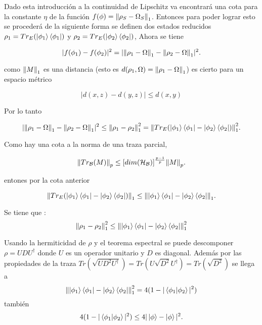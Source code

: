 Dado esta introducción a la continuidad de Lipschitz va encontrará una cota para la constante $\eta$ de la función $f(\phi)=\norm{\rho_{S}-\Omega_{S}}_{1}$. Entonces para poder lograr esto se procederá de la siguiente forma se definen dos estados reducidos $\rho_{1}= Tr_{E} (\ket{\phi_{1}} \bra{\phi_{1}})$ y $\rho_{2}=Tr_{E}(\ket{\phi_{2}} \bra{\phi_{2}})$, Ahora se tiene

\begin{equation}
|f(\phi_{1})-f(\phi_{2})|^2= |\norm{\rho_{1}-\Omega}_{1} - \norm{\rho_{2}-\Omega}_{1}|^2.
\end{equation}

como $\norm{M}_{1}$ es una distancia (esto es $d(\rho_{1},\Omega)= \norm{\rho_{1}-\Omega}_{1}$) es cierto para un espacio métrico

\begin{equation}
|d(x,z)-d(y,z)| \le d(x,y)
\end{equation}

Por lo tanto 

\begin{equation}
|\norm{\rho_{1}-\Omega}_{1} - \norm{\rho_{2}-\Omega}_{1}|^2 \le \norm{\rho_{1}- \rho_{2} }_{1}^2=\norm{Tr_{E}(\ket{\phi_{1}} \bra{\phi_{1}}-\ket{\phi_{2}} \bra{\phi_{2}})}_{1}^{2}.
\end{equation}

Como hay una cota a la norma de una traza parcial,

\begin{equation}
\norm{Tr_{\mathcal{B}}(M)}_{p} \le [dim(\mathcal{H_{B}})]^{\frac{p-1}{p}} \norm{M}_{p}.
\end{equation}

entones por la cota anterior

\begin{equation}
\norm{Tr_{E}(\ket{\phi_{1}} \bra{\phi_{1}}-\ket{\phi_{2}} \bra{\phi_{2}})}_{1} \le \norm{\ket{\phi_{1}} \bra{\phi_{1}}-\ket{\phi_{2}} \bra{\phi_{2}}}_{1}.
\end{equation}

Se tiene que :
\begin{equation}
\norm{\rho_{1}- \rho_{2} }_{1}^2 \le \norm{\ket{\phi_{1}} \bra{\phi_{1}}-\ket{\phi_{2}} \bra{\phi_{2}}}_{1}^{2}
\end{equation}

Usando la hermiticidad de $\rho$ y el teorema espectral se puede descomponer $\rho= UDU^{\dag}$ donde $U$ es un operador unitario y $D$ es diagonal. Además por las propiedades de la traza $Tr(\sqrt{UD^2U^{\dag}})= Tr(U\sqrt{D^2}U^{\dag})= Tr(\sqrt{D^{2}})$ se llega a
\begin{equation}
\norm{\ket{\phi_{1}} \bra{\phi_{1}}-\ket{\phi_{2}} \bra{\phi_{2}}}_{1}^{2} = 4(1-|\bra{\phi_{1}} \ket{\phi_{2}}|^{2})
\end{equation}
también
\begin{equation}
 4(1-|\bra{\phi_{1}} \ket{\phi_{2}}|^{2}) \le 4|\ket{\phi}-\ket{\phi}|^2.
\end{equation}

